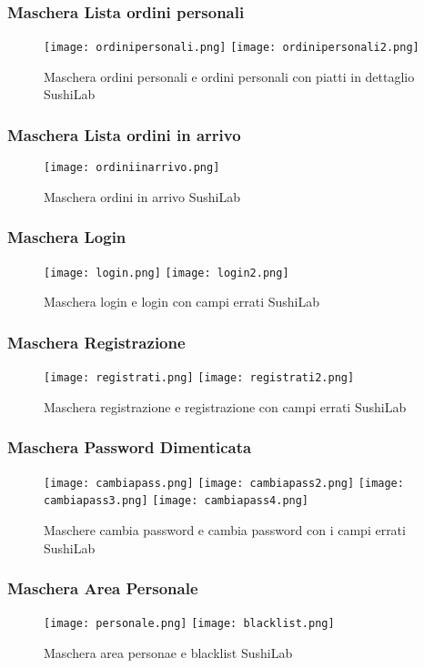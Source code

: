 \subsubsection{Maschera Lista ordini personali}
\begin{figure}[H]
    \centering
    \texttt{[image: ordinipersonali.png]}
    \texttt{[image: ordinipersonali2.png]}
    \caption{Maschera ordini personali e ordini personali con piatti in dettaglio SushiLab}
\end{figure}


\subsubsection{Maschera Lista ordini in arrivo}
\begin{figure}[H]
    \centering
    \texttt{[image: ordiniinarrivo.png]}
    \caption{Maschera ordini in arrivo SushiLab}
\end{figure}


\subsubsection{Maschera Login}
\begin{figure}[H]
    \centering
    \texttt{[image: login.png]}
    \texttt{[image: login2.png]}
    \caption{Maschera login e login con campi errati SushiLab}
\end{figure}


\subsubsection{Maschera Registrazione}
\begin{figure}[H]
    \centering
    \texttt{[image: registrati.png]}
    \texttt{[image: registrati2.png]}
    \caption{Maschera registrazione e registrazione con campi errati SushiLab}
\end{figure}


\subsubsection{Maschera Password Dimenticata}
\begin{figure}[H]
    \centering
    \texttt{[image: cambiapass.png]}
    \texttt{[image: cambiapass2.png]}
    \texttt{[image: cambiapass3.png]}
    \texttt{[image: cambiapass4.png]}
    \caption{Maschere cambia password e cambia password con i campi errati  SushiLab}
\end{figure}


\subsubsection{Maschera Area Personale}
\begin{figure}[H]
    \centering
    \texttt{[image: personale.png]}
    \texttt{[image: blacklist.png]}
    \caption{Maschera area personae e blacklist SushiLab}
\end{figure}